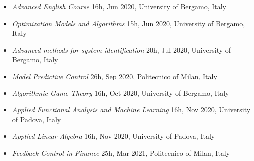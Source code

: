 \documentclass[10pt]{article}
\begin{document}
\begin{itemize}
	\item \textit{Advanced English Course} \hfill 16h, Jun 2020, University of Bergamo, Italy\\
	\vspace{-4pt}{\tiny Prof. S. J. Kingshott}
	
	\item \textit{Optimization Models and Algorithms} \hfill 15h, Jun 2020, University of Bergamo, Italy\\
	\vspace{-4pt}{\tiny Prof. M. T. Vespucci}
	
	\item \textit{Advanced methods for system identification} \hfill 20h, Jul 2020, University of Bergamo, Italy\\
	\vspace{-4pt}{\tiny Prof. M. Mazzoleni}
	
	\item \textit{Model Predictive Control} \hfill 26h, Sep 2020, Politecnico of Milan, Italy\\
	\vspace{-4pt}{\tiny Proff. M. Farina, R. Scattolini and L. Fagiano}

	\item \textit{Algorithmic Game Theory} \hfill 16h, Oct 2020, University of Bergamo, Italy\\
	\vspace{-4pt}{\tiny Prof. N. Gatti and Dr. A. Marchesi}

	\item \textit{Applied Functional Analysis and Machine Learning} \hfill 16h, Nov 2020, University of Padova, Italy\\
	\vspace{-4pt}{\tiny Prof. G. Pillonetto}

	\item \textit{Applied Linear Algebra} \hfill 16h, Nov 2020, University of Padova, Italy\\
	\vspace{-4pt}{\tiny Prof. L. Schenato}

	\item \textit{Feedback Control in Finance} \hfill 25h, Mar 2021, Politecnico of Milan, Italy\\
	\vspace{-4pt}{\tiny Prof. S. Formentin}
\end{itemize}
\end{document}
